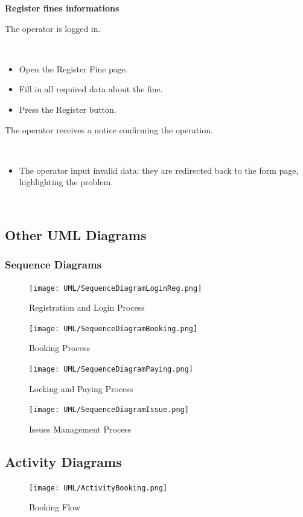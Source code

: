 \documentclass[11pt]{article} %
\begin{document}
\begin{description}[noitemsep,topsep=0pt,parsep=0pt,partopsep=0pt]
	\item[Name:] \textbf{Register fines informations}
	\item[Entry Conditions:] The operator is logged in.
	\item[Flow Of Events:] \hfill\
	\begin{itemize}
		\item Open the Register Fine page.
		\item Fill in all required data about the fine.
		\item Press the Register button.
	\end{itemize}
	\item[Exit conditions:]  The operator receives a notice confirming the operation.
	\item[Exceptions:] \hfill\
	\begin{itemize}
		\item The operator input invalid data: they are redirected back to the form page, highlighting the problem.
	\end{itemize}
\end{description}
\hfill\

\subsection{Other UML Diagrams}

\subsubsection{Sequence Diagrams}
\begin{figure}[H]
	\centering
	\texttt{[image: UML/SequenceDiagramLoginReg.png]}
	\caption{Registration and Login Process}
\end{figure}
\begin{figure}[H]
	\centering
	\texttt{[image: UML/SequenceDiagramBooking.png]}
	\caption{Booking Process}
\end{figure}
\begin{figure}[H]
	\centering
	\texttt{[image: UML/SequenceDiagramPaying.png]}
	\caption{Locking and Paying Process}
\end{figure}
\begin{figure}[H]
	\centering
	\texttt{[image: UML/SequenceDiagramIssue.png]}
	\caption{Issues Management Process}
\end{figure}

\subsection{Activity Diagrams}
\begin{figure}[H]
	\centering
	\texttt{[image: UML/ActivityBooking.png]}
	\caption{Booking Flow}
\end{figure}
\end{document}
